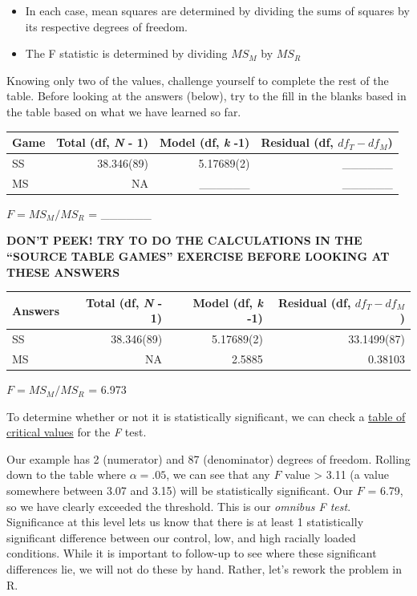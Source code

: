 \documentclass[
  english,
]{book}
\providecommand{\tightlist}{%
  \setlength{\itemsep}{0pt}\setlength{\parskip}{0pt}}
\begin{document}
\begin{itemize}
\tightlist
\item
  In each case, mean squares are determined by dividing the sums of squares by its respective degrees of freedom.
\item
  The F statistic is determined by dividing \(MS_M\) by \(MS_R\)
\end{itemize}

Knowing only two of the values, challenge yourself to complete the rest of the table. Before looking at the answers (below), try to the fill in the blanks based in the table based on what we have learned so far.

\begin{longtable}[]{@{}lrrr@{}}
\toprule
Game & Total (df, \emph{N} - 1) & Model (df, \emph{k} -1) & Residual (df, \(df_T - df_M\)) \\
\midrule
\endhead
SS & 38.346(89) & 5.17689(2) & \_\_\_\_\_\_ \\
MS & NA & \_\_\_\_\_\_ & \_\_\_\_\_\_ \\
\bottomrule
\end{longtable}

\(F = MS_{M}/MS_{R}\) = \_\_\_\_\_\_

\textbf{DON'T PEEK! TRY TO DO THE CALCULATIONS IN THE ``SOURCE TABLE GAMES'' EXERCISE BEFORE LOOKING AT THESE ANSWERS}

\begin{longtable}[]{@{}lrrr@{}}
\toprule
Answers & Total (df, \emph{N} - 1) & Model (df, \emph{k} -1) & Residual (df, \(df_T - df_M\)) \\
\midrule
\endhead
SS & 38.346(89) & 5.17689(2) & 33.1499(87) \\
MS & NA & 2.5885 & 0.38103 \\
\bottomrule
\end{longtable}

\(F = MS_{M}/MS_{R}\) = 6.973

To determine whether or not it is statistically significant, we can check a \href{https://www.statology.org/how-to-read-the-f-distribution-table/}{table of critical values} \citep{zach_how_2019} for the \emph{F} test.

Our example has 2 (numerator) and 87 (denominator) degrees of freedom. Rolling down to the table where \(\alpha = .05\), we can see that any \(F\) value \textgreater{} 3.11 (a value somewhere between 3.07 and 3.15) will be statistically significant. Our \(F\) = 6.79, so we have clearly exceeded the threshold. This is our \emph{omnibus F test}. Significance at this level lets us know that there is at least 1 statistically significant difference between our control, low, and high racially loaded conditions. While it is important to follow-up to see where these significant differences lie, we will not do these by hand. Rather, let's rework the problem in R.
\end{document}
